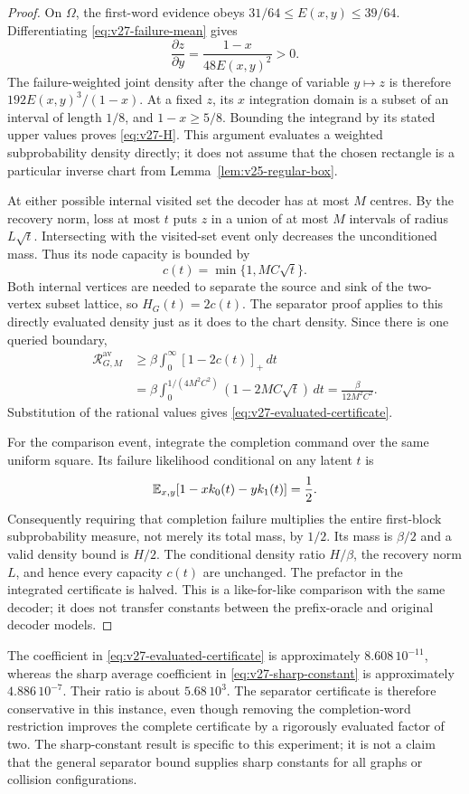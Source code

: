 \begin{proof}
On $\Omega$, the first-word evidence obeys $31/64\le E(x,y)\le39/64$. Differentiating \eqref{eq:v27-failure-mean} gives
\[
                   \frac{\partial z}{\partial y}
                               =\frac{1-x}{48E(x,y)^2}>0.
\]
The failure-weighted joint density after the change of variable $y\mapsto z$ is therefore $192E(x,y)^3/(1-x)$. At a fixed $z$, its $x$ integration domain is a subset of an interval of length $1/8$, and $1-x\ge5/8$. Bounding the integrand by its stated upper values proves \eqref{eq:v27-H}. This argument evaluates a weighted subprobability density directly; it does not assume that the chosen rectangle is a particular inverse chart from Lemma~\ref{lem:v25-regular-box}.

At either possible internal visited set the decoder has at most $M$ centres. By the recovery norm, loss at most $t$ puts $z$ in a union of at most $M$ intervals of radius $L\sqrt t$. Intersecting with the visited-set event only decreases the unconditioned mass. Thus its node capacity is bounded by
\[
                   c(t)=\min\{1,MC\sqrt t\}.
\]
Both internal vertices are needed to separate the source and sink of the two-vertex subset lattice, so $H_G(t)=2c(t)$. The separator proof applies to this directly evaluated density just as it does to the chart density. Since there is one queried boundary,
\[
 \begin{split}
 \mathcal R^{\mathrm{av}}_{G,M}
 &\ge\beta\int_0^\infty[1-2c(t)]_+\,dt\\
 &=\beta\int_0^{1/(4M^2C^2)}(1-2MC\sqrt t)\,dt
   =\frac{\beta}{12M^2C^2}.
 \end{split}
\]
Substitution of the rational values gives \eqref{eq:v27-evaluated-certificate}.

For the comparison event, integrate the completion command over the same uniform square. Its failure likelihood conditional on any latent $t$ is
\[
                  \mathbb E_{x,y}[1-xk_0(t)-yk_1(t)]=\frac12.
\]
Consequently requiring that completion failure multiplies the entire first-block subprobability measure, not merely its total mass, by $1/2$. Its mass is $\beta/2$ and a valid density bound is $H/2$. The conditional density ratio $H/\beta$, the recovery norm $L$, and hence every capacity $c(t)$ are unchanged. The prefactor in the integrated certificate is halved. This is a like-for-like comparison with the same decoder; it does not transfer constants between the prefix-oracle and original decoder models.
\end{proof}

The coefficient in \eqref{eq:v27-evaluated-certificate} is approximately $8.608\,10^{-11}$, whereas the sharp average coefficient in \eqref{eq:v27-sharp-constant} is approximately $4.886\,10^{-7}$. Their ratio is about $5.68\,10^3$. The separator certificate is therefore conservative in this instance, even though removing the completion-word restriction improves the complete certificate by a rigorously evaluated factor of two. The sharp-constant result is specific to this experiment; it is not a claim that the general separator bound supplies sharp constants for all graphs or collision configurations.
